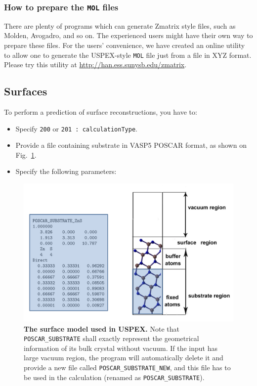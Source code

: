 \documentclass[12pt]{article}
\newcommand{\file}[1]{\texttt{#1}}
\begin{document}
\subsubsection{How to prepare the \file{MOL} files}

There are plenty of programs which can generate Zmatrix style files, such as
Molden, Avogadro, and so on. The experienced users might have their own way to
prepare these files. For the users' convenience, we have created an online
utility to allow one to generate the USPEX-style \file{MOL} file just from a
file in XYZ format. Please try this utility at
\textcolor{blue}{\url{http://han.ess.sunysb.edu/zmatrix}}.


\subsection{Surfaces} \label{surfaces}
To perform a prediction of surface reconstructions, you have to:
\begin{itemize}
\item Specify \texttt{200} or \texttt{201 : calculationType}.
\item Provide a file containing substrate in VASP5 POSCAR format, as shown
on Fig.~\ref{fig:surface}.
\item Specify the following parameters:
\end{itemize}

\begin{figure}[hbtp]
\centering
\includegraphics[scale=0.5]{pic/Surface.png}
\caption{\footnotesize \textbf{The surface model used in USPEX.} Note that
\file{POSCAR\_SUBSTRATE} shall exactly represent the geometrical information of
its bulk crystal without vacuum. If the input has large vacuum region, the
program will automatically delete it and provide a new file called
\file{POSCAR\_SUBSTRATE\_NEW}, and this file has to be used in the calculation
(renamed as \file{POSCAR\_SUBSTRATE}).}
\label{fig:surface}
\end{figure}
\end{document}
